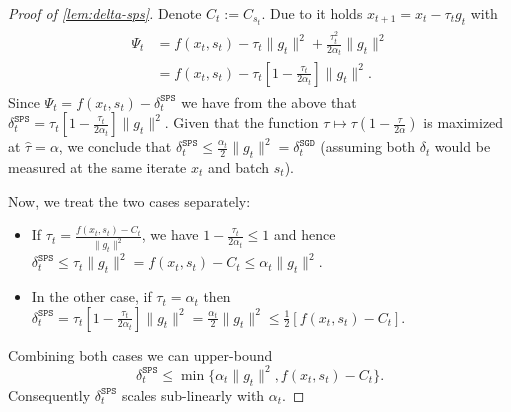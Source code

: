 \documentclass{article}
\newcommand{\SGD}{{\texttt{SGD}}}
\newcommand{\SPS}{{\texttt{SPS}}}
\theoremstyle{plain}
\theoremstyle{definition}
\theoremstyle{remark}
\begin{document}
\begin{proof}[Proof of \cref{lem:delta-sps}]
Denote $C_t:=C_{s_t}$.
Due to \citet[Lem.\ 9]{Schaipp2023} it holds $x_{t+1} = x_t - \tau_t g_t$ with
\begin{align*}
    \begin{split}
    \Psi_t &= f(x_t, s_t) - \tau_t\|g_t\|^2 + \frac{\tau_t^2}{2\alpha_t}\|g_t\|^2 \\
    &= f(x_t, s_t) - \tau_t[1-\frac{\tau_t}{2\alpha_t}]\|g_t\|^2.
    \end{split}
\end{align*}
Since $ \Psi_t = f(x_t,s_t) -\delta_t^{\SPS{}}$  we have from the above that $\delta_t^{\SPS{}} = \tau_t[1-\frac{\tau_t}{2\alpha_t}]\|g_t\|^2$.
Given that the function $\tau \mapsto \tau(1-\frac{\tau}{2\alpha})$ is maximized at $\hat \tau=\alpha$, we conclude that $\delta_t^{\SPS{}} \leq \frac{\alpha_t}{2}\|g_t\|^2 = \delta_t^{\SGD{}}$ (assuming both $\delta_t$ would be measured at the same iterate $x_t$ and batch $s_t$).

Now, we treat the two cases separately:
\begin{itemize}
    \item If $\tau_t = \frac{f(x_t,s_t)-C_t}{\|g_t\|^2}$, we have $1-\frac{\tau_t}{2\alpha_t} \leq 1$ and hence $\delta_t^{\SPS{}} \leq \tau_t \|g_t\|^2 = f(x_t,s_t)-C_t \leq \alpha_t \|g_t\|^2$.
    \item In the other case, if $\tau_t=\alpha_t$ then $\delta_t^{\SPS{}} = \tau_t[1-\frac{\tau_t}{2\alpha_t}]\|g_t\|^2 = \frac{\alpha_t}{2}\|g_t\|^2 \leq \frac{1}{2}[f(x_t,s_t)-C_t]$.
\end{itemize}
%
Combining both cases we can upper-bound 
\begin{equation}
    \delta_t^{\SPS{}} \leq \min\{\alpha_t\|g_t\|^2, f(x_t,s_t)-C_t \}.
\end{equation}
Consequently $\delta_t^{\SPS{}}$ scales sub-linearly with $\alpha_t$.
\end{proof}
\end{document}
